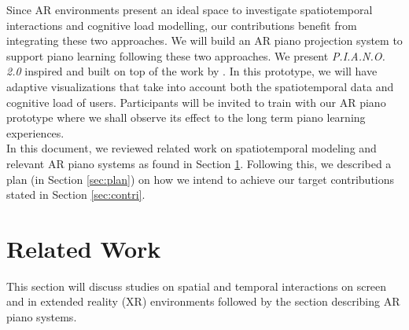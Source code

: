 \documentclass[manuscript,screen]{acmart}
\begin{document}

Since AR environments present an ideal space to investigate spatiotemporal interactions and cognitive load modelling, our contributions benefit from integrating these two approaches. We will build an AR piano projection system to support piano learning following these two approaches. We present \textit{P.I.A.N.O. 2.0} inspired and built on top of the work by \citet{rogers2014piano}. In this prototype, we will have adaptive visualizations that take into account both the spatiotemporal data and cognitive load of users. Participants will be invited to train with our AR piano prototype where we shall observe its effect to the long term piano learning experiences.\\

In this document, we reviewed related work on spatiotemporal modeling and relevant AR piano systems as found in Section \ref{sec:rrl}. Following this, we described a plan (in Section \ref{sec:plan}) on how we intend to achieve our target contributions stated in Section \ref{sec:contri}. \\



\section{Related Work}
\label{sec:rrl}
This section will discuss studies on spatial and temporal interactions on screen and in extended reality (XR) environments followed by the section describing AR piano systems. 
\end{document}
